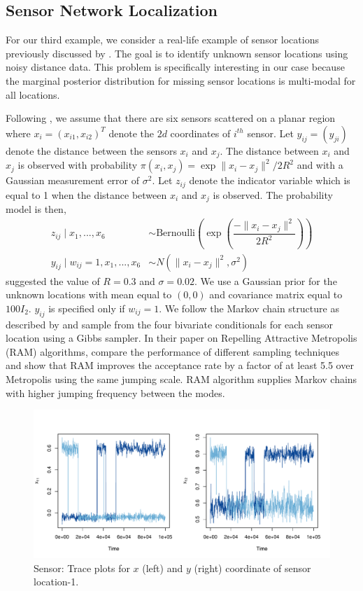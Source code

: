 \documentclass[11pt]{article}
\theoremstyle{remark}
\begin{document}
\subsection{Sensor Network Localization}

For our third example, we consider a real-life example of sensor locations previously discussed by \cite{ihler2005nonparametric}. The goal is to identify unknown sensor locations using noisy distance data. This problem is specifically interesting in our case because the marginal posterior distribution for missing sensor locations is multi-modal for all locations. 

Following \cite{tak2018repelling}, we assume that there are six sensors scattered on a planar region where $x_i = (x_{i1}, x_{i2})^T$ denote the $2d$ coordinates of $i^{th}$ sensor. Let $y_{ij} = (y_{ji})$ denote the distance between the sensors $x_i$ and $x_j$. The distance between $x_i$ and $x_j$ is observed with probability $\pi (x_i, x_j) = \exp{\|x_i - x_j\|^2 / 2R^2}$ and with a Gaussian measurement error of $\sigma^2$. Let $z_{ij}$ denote the indicator variable which is equal to 1 when the distance between $x_i$ and $x_j$ is observed. The probability model is then,
%
\begin{align*}
    z_{ij} \mid x_1, ..., x_6 & \sim \text{Bernoulli}\left(\exp\left(\dfrac{-\|x_i - x_j\|^2}{2R^2}\right)\right)\\
    y_{ij} \mid w_{ij} = 1, x_1, ..., x_6 &\sim N(\|x_i - x_j\|^2, \sigma^2)
\end{align*}
%
\cite{ahn2013distributed} suggested the value of $R = 0.3$ and $\sigma = 0.02$. We use a Gaussian prior for the unknown locations with  mean equal to $(0,0)$ and covariance matrix equal to $100 I_2$. $y_{ij}$ is specified only if $w_{ij} = 1$. We follow the Markov chain structure as described by \cite{tak2018repelling} and sample from the four bivariate conditionals for each sensor location using a Gibbs sampler. In their paper on Repelling Attractive Metropolis (RAM) algorithms, \cite{tak2018repelling} compare the performance of different sampling techniques and show that RAM improves the acceptance rate by a factor of at least 5.5 over Metropolis using the same jumping scale. RAM algorithm supplies Markov chains with higher jumping frequency between the modes.

\begin{figure}[h]
    \centering
    \includegraphics[width = .6\textwidth]{plots/sensor-trace_loc1.pdf}
    \caption{Sensor: Trace plots for $x$ (left) and $y$ (right) coordinate of sensor location-1.}
    \label{fig:sensor-trace}
\end{figure}
\end{document}

